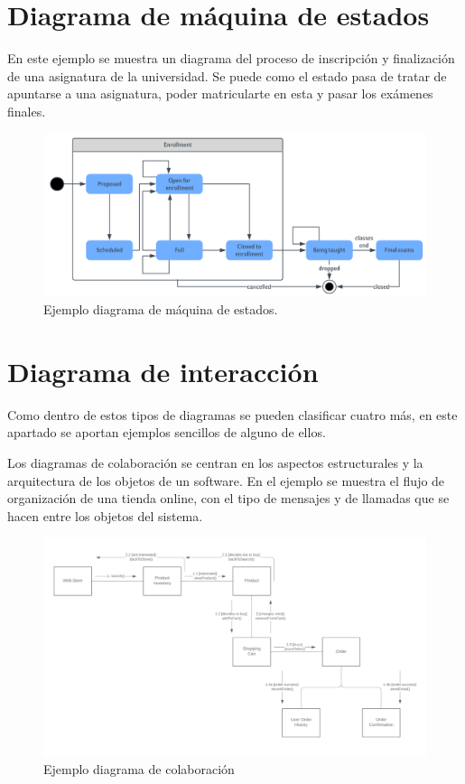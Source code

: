 \documentclass[a4paper, 12pt]{book}
\begin{document}
\section{Diagrama de máquina de estados}
En este ejemplo se muestra un diagrama del proceso de inscripción y finalización de una asignatura de la universidad. Se puede como el estado pasa de tratar de apuntarse a una asignatura, poder matricularte en esta y pasar los exámenes finales. 
\begin{figure}
	\centering
	\includegraphics[width=16cm, keepaspectratio]{img/diagrama_maquina_estados.png}
	\caption{Ejemplo diagrama de máquina de estados.}\label{fig:diagrama_maquina_estados}
\end{figure}

\section{Diagrama de interacción}
Como dentro de estos tipos de diagramas se pueden clasificar cuatro más, en este apartado se aportan ejemplos sencillos de alguno de ellos.

Los diagramas de colaboración se centran en los aspectos estructurales y la arquitectura de los objetos de un software. En el ejemplo se muestra el flujo de organización de una tienda online, con el tipo de mensajes y de llamadas que se hacen entre los objetos del sistema. 
\begin{figure}
	\centering
	\includegraphics[width=14cm, keepaspectratio]{img/diagrama_colaboracion.png}
	\caption{Ejemplo diagrama de colaboración}\label{fig:diagrama_colaboracion}
\end{figure}
\end{document}
